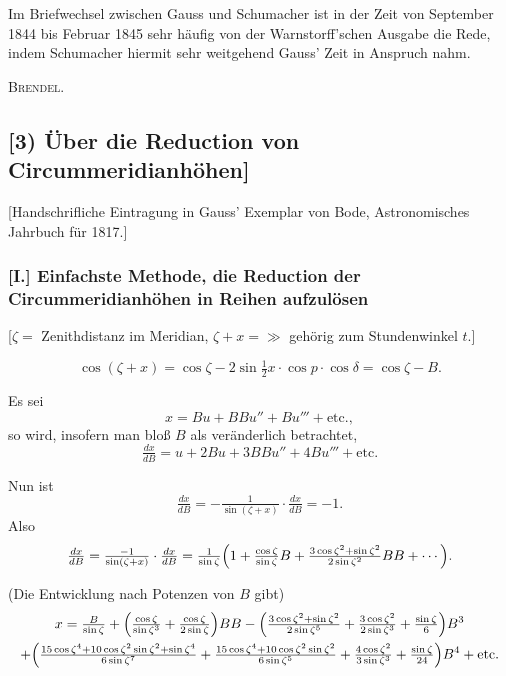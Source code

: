 \documentclass[12pt,a4paper]{article}
\theoremstyle{plain}
\theoremstyle{definition}
\theoremstyle{remark}
\begin{document}
Im Briefwechsel zwischen Gauss und Schumacher ist in der Zeit von September 1844 bis Februar 1845 sehr h\"aufig von der Warnstorff'schen Ausgabe die Rede, indem Schumacher hiermit sehr weitgehend Gauss' Zeit in Anspruch nahm.

\hfill\textsc{Brendel}.

\newpage

\subsection*{[3) \"Uber die Reduction von Circummeridianh\"ohen]}

[Handschrifliche Eintragung in Gauss' Exemplar von Bode, Astronomisches Jahrbuch f\"ur 1817.]

\subsubsection*{[I.] Einfachste Methode, die Reduction der Circummeridianh\"ohen in Reihen aufzul\"osen}

[$\zeta =$ Zenithdistanz im Meridian, $\zeta + x = \gg$ geh\"orig zum Stundenwinkel $t$.]

\[
\cos(\zeta + x) = \cos\zeta - 2\sin\tfrac{1}{2}x \cdot \cos p \cdot \cos\delta = \cos\zeta - B.
\]

Es sei
\[
x = Bu + BBu'' + Bu''' + \text{etc.},
\]
so wird, insofern man blo\ss{} $B$ als ver\"anderlich betrachtet,
\[
\tfrac{dx}{dB} = u + 2Bu + 3BBu'' + 4Bu''' + \text{etc.}
\]

Nun ist
\[
\tfrac{dx}{dB} = -\tfrac{1}{\sin(\zeta+x)} \cdot \tfrac{dx}{dB} = -1.
\]
Also
\[
\tfrac{dx}{dB} = \tfrac{-1}{\sin(\zeta+x)} \cdot \tfrac{dx}{dB} = \tfrac{1}{\sin\zeta}\Bigl(1 + \tfrac{\cos\zeta}{\sin\zeta} B + \tfrac{3\cos\zeta^2 + \sin\zeta^2}{2\sin\zeta^2} BB + \cdots\Bigr).
\]

(Die Entwicklung nach Potenzen von $B$ gibt)
\begin{multline*}
x = \tfrac{B}{\sin\zeta} + \Bigl(\tfrac{\cos\zeta}{\sin\zeta^3} + \tfrac{\cos\zeta}{2\sin\zeta}\Bigr) BB - \Bigl(\tfrac{3\cos\zeta^2 + \sin\zeta^2}{2\sin\zeta^5} + \tfrac{3\cos\zeta^2}{2\sin\zeta^3} + \tfrac{\sin\zeta}{6}\Bigr) B^3 \\
+ \Bigl(\tfrac{15\cos\zeta^4 + 10\cos\zeta^2\sin\zeta^2 + \sin\zeta^4}{6\sin\zeta^7} + \tfrac{15\cos\zeta^4 + 10\cos\zeta^2\sin\zeta^2}{6\sin\zeta^5} + \tfrac{4\cos\zeta^2}{3\sin\zeta^3} + \tfrac{\sin\zeta}{24}\Bigr) B^4 + \text{etc.}
\end{multline*}
\end{document}
